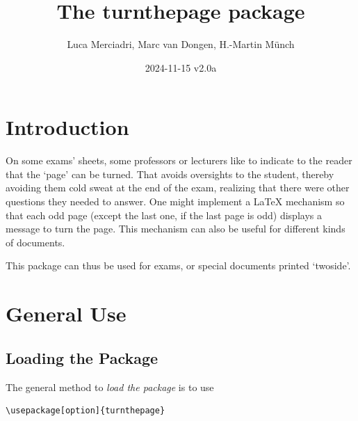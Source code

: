 \documentclass[12pt,a4paper,twoside]{article}
\title{The \textbf{turnthepage} package}
\author{Luca Merciadri, Marc van Dongen, H.-Martin M\"unch}
\date{2024-11-15 v2.0a}
\begin{document}
\maketitle
\tableofcontents
\newpage
\section{Introduction}
On some exams' sheets, some professors or lecturers like to indicate to the reader that the `page' can be turned.
That avoids oversights to the student, thereby avoiding them cold sweat at the end of the exam, realizing that
there were other questions they needed to answer. One might implement a \LaTeX{} mechanism so that each odd page
(except the last one, if the last page is odd) displays a message to turn the page. This mechanism can also
be useful for different kinds of documents.

This package can thus be used for exams, or special documents printed `twoside'.

\section{General Use}

\subsection{Loading the Package}
The general method to \textit{load the package} is to use
\begin{center}
\begin{verbatim}
\usepackage[option]{turnthepage}
\end{verbatim}
\end{center}
\end{document}
